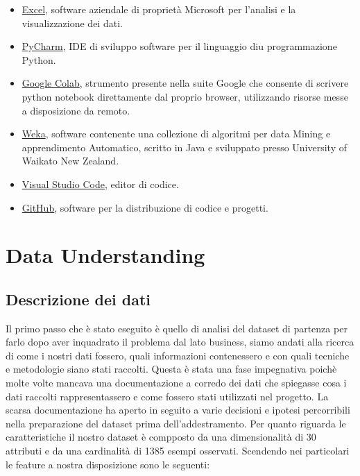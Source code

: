 \documentclass[italian,12pt,a4paper]{article}
\begin{document}
	\begin{itemize}
         \item \href{https://www.microsoft.com/it-it/microsoft-365/excel}{Excel}, software aziendale di proprietà Microsoft per l'analisi e la visualizzazione dei dati. 
        \item \href{https://www.jetbrains.com/pycharm/}{PyCharm}, IDE di sviluppo software per il linguaggio diu programmazione Python.
		\item \href{https://colab.research.google.com/}{Google Colab}, strumento  presente nella suite Google che consente di scrivere python notebook direttamente dal proprio browser, utilizzando risorse messe a disposizione da remoto. 		
        \item \href{https://www.cs.waikato.ac.nz/~ml/weka/}{Weka}, software contenente una collezione di algoritmi per data Mining e apprendimento Automatico, scritto in Java e sviluppato presso University of Waikato New Zealand.
		\item \href{https://code.visualstudio.com/}{Visual Studio Code}, editor di codice.
       \item \href{https://github.com/}{GitHub}, software per la distribuzione di codice e progetti.
	\end{itemize}
 
    \vspace{30pt}
    
	\section{Data Understanding}
 
    \subsection{Descrizione dei dati}
    Il primo passo che è stato eseguito è quello di analisi del dataset di partenza per farlo dopo aver inquadrato il problema dal lato business, siamo andati alla ricerca di come i nostri dati fossero, quali informazioni contenessero e con quali tecniche e metodologie siano stati raccolti. Questa è stata una fase impegnativa poichè molte volte mancava una documentazione a corredo dei dati che spiegasse cosa i dati raccolti rappresentassero e come fossero stati utilizzati nel progetto. La scarsa documentazione ha aperto in seguito a varie decisioni e ipotesi percorribili nella preparazione del dataset prima dell'addestramento. Per quanto riguarda le caratteristiche il nostro dataset è compposto da una dimensionalità di 30 attributi e da una cardinalità di 1385 esempi osservati. Scendendo nei particolari le feature a nostra disposizione sono le seguenti: 
    \\ 
    
\end{document}
